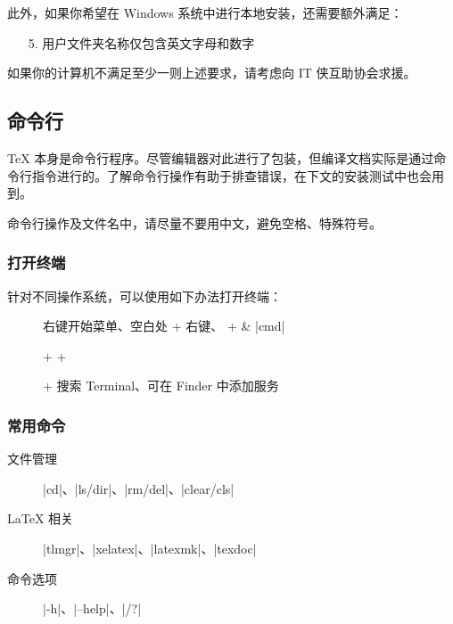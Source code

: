 此外，如果你希望在 Windows 系统中进行本地安装，还需要额外满足：

\begin{enumerate}
  \item[5.] 用户文件夹名称仅包含英文字母和数字
\end{enumerate}

如果你的计算机不满足至少一则上述要求，请考虑向 IT 侠互助协会求援。

\subsection{命令行}
\label{subsec:terminal}

\TeX{} 本身是命令行程序。尽管编辑器对此进行了包装，但编译文档实际是通过命令行指令进行的。了解命令行操作有助于排查错误，在下文的安装测试中也会用到。

命令行操作及文件名中，请尽量不要用中文，避免空格、特殊符号。

\subsubsection{打开终端}

针对不同操作系统，可以使用如下办法打开终端：

\begin{description}
  \item[\faWindows{}] 右键开始菜单、空白处  + 右键、 +  \& |cmd|
  \item[\faLinux{}]  +  + 
  \item[\faApple{}]  +  搜索 Terminal、可在 Finder 中添加服务
\end{description}

\subsubsection{常用命令}

\begin{description}
  \item[文件管理] |cd|、|ls/dir|、|rm/del|、|clear/cls|
  \item[\LaTeX{} 相关] |tlmgr|、|xelatex|、|latexmk|、|texdoc|
  \item[命令选项] |-h|、|--help|、|/?|
\end{description}


